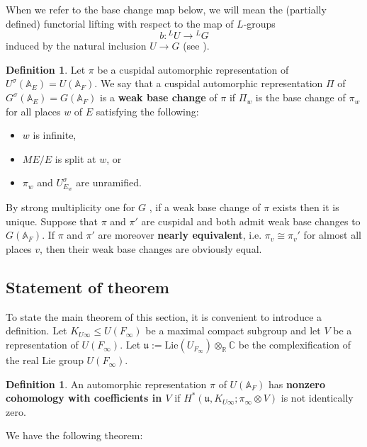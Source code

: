 \documentclass[12pt]{amsart}
\theoremstyle{remark}
\numberwithin{equation}{section}
\newcommand{\A}{\mathbb{A}}
\newcommand{\lto}{\longrightarrow}
\newcommand{\CC}{\mathbb{C}}
\newcommand{\RR}{\mathbb{R}}
\theoremstyle{definition}
\newtheorem{defn}[thm]{Definition}
\numberwithin{equation}{subsection}
\begin{document}
When we refer to the base change map below, we will mean the (partially defined)
functorial lifting with respect to the map of $L$-groups
$$
b:{}^LU \lto {}^LG
$$
induced by the natural inclusion $U \to G$ (see \cite{HarLab}).

\begin{defn} \label{defn-wbc} Let $\pi$ be a cuspidal automorphic representation of $U^{\sigma}(\A_E)=U(\A_F)$.  We say that a cuspidal automorphic representation $\Pi$ of $G^{\sigma}(\A_E)=G(\A_F)$ is a \textbf{weak base change}
of $\pi$ if $\Pi_w$ is the base change of $\pi_w$ for all places $w$ of $E$ satisfying the following:
\begin{itemize}
\item $w$ is infinite,
\item $ME/E$ is split at $w$, or
\item $\pi_w$ and $U^{\sigma}_{E_w}$ are unramified.
\end{itemize}
\end{defn}
By strong multiplicity one for $G$ \cite{Badu}, if a weak base change of $\pi$ exists then it is unique.  Suppose that $\pi$ and $\pi'$ are cuspidal and both admit weak base changes to $G(\A_F)$.  If $\pi$ and $\pi'$ are moreover \textbf{nearly equivalent}, i.e. $\pi_v \cong \pi_{v}'$ for almost all places $v$, then their weak base changes are obviously equal.


\subsection{Statement of theorem} \label{ssec-st-thms}

To state the main theorem of this section, it is convenient to introduce a definition.  Let $K_{U\infty} \leq
U(F_{\infty})$ be a maximal compact subgroup and let $V$ be a representation of $U(F_{\infty})$.
Let $\mathfrak{u}:=\mathrm{Lie}(U_{F_{\infty}}) \otimes_{\RR}\CC$ be the complexification of the real Lie group
 $U(F_{\infty})$.

\begin{defn} \label{cohom-defn} An automorphic representation $\pi$ of $U(\A_F)$ has \textbf{nonzero cohomology with
coefficients in $V$} if $H^*(\mathfrak{u},K_{U\infty};\pi_{\infty} \otimes V)$ is not identically zero.
\end{defn}

We have the following theorem:
\end{document}
